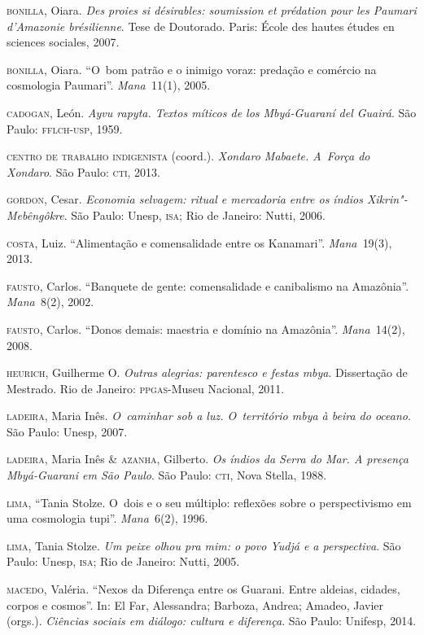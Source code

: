 \begin{Parskip}
\textsc{bonilla}, Oiara. \emph{Des proies si désirables: soumission et prédation pour
les Paumari d’Amazonie br\'{e}silienne}. Tese de Doutorado. Paris:
École des hautes études en sciences sociales, 2007.

\textsc{bonilla}, Oiara. ``O~bom patrão e o inimigo voraz: predação e comércio na
cosmologia Paumari''. \emph{Mana~}11(1), 2005.

\textsc{cadogan}, León. \emph{Ayvu rapyta. Textos míticos de los Mbyá-Guaraní del
Guairá}. São Paulo: \textsc{fflch}-\textsc{usp}, 1959.

\textsc{centro} \textsc{de} \textsc{trabalho} \textsc{indigenista} (coord.). \emph{Xondaro Mabaete. A~Força do
Xondaro}. São Paulo: \textsc{cti}, 2013.

\textsc{gordon}, Cesar. \emph{Economia selvagem: ritual e mercadoria entre os índios
Xikrin"-Mebêngôkre}. São Paulo: Unesp, \textsc{isa}; Rio de Janeiro: Nutti, 2006.

\textsc{costa}, Luiz. ``Alimentação e comensalidade entre os Kanamari''. \emph{Mana~}19(3),
2013.

\textsc{fausto}, Carlos. ``Banquete de gente: comensalidade e canibalismo na
Amazônia''. \emph{Mana~}8(2), 2002.

\textsc{fausto}, Carlos. ``Donos demais: maestria e domínio na Amazônia''. \emph{Mana~}14(2),
2008.

\textsc{heurich}, Guilherme O. \emph{Outras alegrias: parentesco e festas mbya}.
Dissertação de Mestrado. Rio de Janeiro: \textsc{ppgas}-Museu Nacional, 2011.

\textsc{ladeira}, Maria Inês. \emph{O~caminhar sob a luz. O~território mbya à beira do
oceano}. São Paulo: Unesp, 2007.

\textsc{ladeira}, Maria Inês \& \textsc{azanha}, Gilberto. \emph{Os índios da Serra do Mar. A
presença Mbyá-Guarani em São Paulo}. São Paulo: \textsc{cti}, Nova Stella, 1988.

\textsc{lima}, ``Tania Stolze. O~dois e o seu múltiplo: reflexões sobre o
perspectivismo em uma cosmologia tupi''. \emph{Mana~}6(2), 1996.

\textsc{lima}, Tania Stolze. \emph{Um peixe olhou pra mim: o povo Yudjá e a
perspectiva}. São Paulo: Unesp, \textsc{isa}; Rio de Janeiro: Nutti, 2005.

\textsc{macedo}, Valéria. ``Nexos da Diferença entre os Guarani. Entre
aldeias, cidades, corpos e cosmos''. In: El Far, Alessandra; Barboza,
Andrea; Amadeo, Javier (orgs.). \emph{Ciências sociais em diálogo: cultura e diferença}. São Paulo: Unifesp, 2014.


\end{Parskip}
